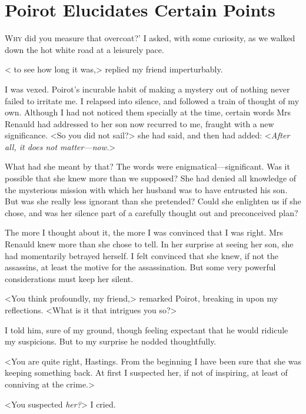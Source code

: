 \chapter{Poirot Elucidates Certain Points}
	
\lettrine[ante=`]{W}{hy} did you measure that overcoat?' I asked, with some curiosity, as we walked down the hot white road at a leisurely pace. 

\zz
 < to see how long it was,> replied my friend imperturbably. 

 I was vexed. Poirot's incurable habit of making a mystery out of nothing never failed to irritate me. I relapsed into silence, and followed a train of thought of my own. Although I had not noticed them specially at the time, certain words Mrs Renauld had addressed to her son now recurred to me, fraught with a new significance. <So you did not sail?> she had said, and then had added: <\emph{After all, it does not matter—now.}> 

 What had she meant by that? The words were enigmatical—significant. Was it possible that she knew more than we supposed? She had denied all knowledge of the mysterious mission with which her husband was to have entrusted his son. But was she really less ignorant than she pretended? Could she enlighten us if she chose, and was her silence part of a carefully thought out and preconceived plan? 

 The more I thought about it, the more I was convinced that I was right. Mrs Renauld knew more than she chose to tell. In her surprise at seeing her son, she had momentarily betrayed herself. I felt convinced that she knew, if not the assassins, at least the motive for the assassination. But some very powerful considerations must keep her silent. 

 <You think profoundly, my friend,> remarked Poirot, breaking in upon my reflections. <What is it that intrigues you so?> 

 I told him, sure of my ground, though feeling expectant that he would ridicule my suspicions. But to my surprise he nodded thoughtfully. 

 <You are quite right, Hastings. From the beginning I have been sure that she was keeping something back. At first I suspected her, if not of inspiring, at least of conniving at the crime.> 

 <You suspected \emph{her?}> I cried. 

